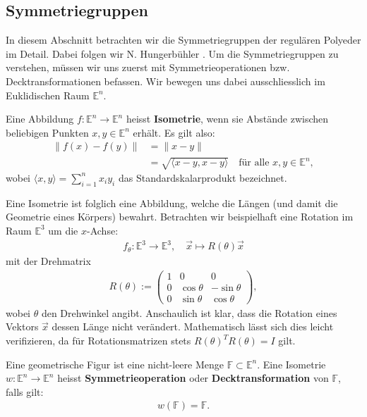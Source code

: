 \subsection{Symmetriegruppen} \label{sec:symmetrieeigenschaftwürfel}

In diesem Abschnitt betrachten wir die Symmetriegruppen der regulären Polyeder im Detail. Dabei folgen wir N. Hungerbühler \cite{hungerbuehler_kombinatorik1}. Um die Symmetriegruppen zu verstehen, müssen wir uns zuerst mit Symmetrieoperationen bzw. Decktransformationen befassen. Wir bewegen uns dabei ausschliesslich im Euklidischen Raum $\mathbb{E}^n$.

\begin{definition}
    Eine Abbildung $f: \mathbb{E}^n \to \mathbb{E}^n$ heisst \textbf{Isometrie}, wenn sie Abstände zwischen beliebigen Punkten $x, y \in \mathbb{E}^n$ erhält. Es gilt also:
    \begin{align}
        \|f(x) - f(y)\| &= \|x - y\| \nonumber \\
        &= \sqrt{\langle x - y, x - y \rangle} \quad \text{für alle } x, y \in \mathbb{E}^n, \nonumber
    \end{align}
    wobei $\langle x, y \rangle = \sum_{i=1}^n x_i y_i$ das Standardskalarprodukt bezeichnet.
\end{definition}

Eine Isometrie ist folglich eine Abbildung, welche die Längen (und damit die Geometrie eines Körpers) bewahrt. Betrachten wir beispielhaft eine Rotation im Raum $\mathbb{E}^3$ um die $x$-Achse:
\begin{align}
     f_\theta: \mathbb{E}^3 \rightarrow \mathbb{E}^3, \quad \vec{x} \mapsto R(\theta) \vec{x} \nonumber
\end{align}
mit der Drehmatrix
\begin{align}
    R(\theta) := \begin{pmatrix} 1 & 0 & 0 \\ 0 & \cos\theta & -\sin\theta \\ 0 & \sin\theta & \cos\theta \end{pmatrix} \nonumber,
\end{align}
wobei $\theta$ den Drehwinkel angibt. Anschaulich ist klar, dass die Rotation eines Vektors $\vec{x}$ dessen Länge nicht verändert. Mathematisch lässt sich dies leicht verifizieren, da für Rotationsmatrizen stets $R(\theta)^T R(\theta) = I$ gilt.

\begin{definition} \label{def:decktransformation}
    Eine geometrische Figur ist eine nicht-leere Menge $\mathbb{F} \subset \mathbb{E}^n$. Eine Isometrie $w: \mathbb{E}^n \to \mathbb{E}^n$ heisst \textbf{Symmetrieoperation} oder \textbf{Decktransformation} von $\mathbb{F}$, falls gilt:
    \begin{align}
        w(\mathbb{F}) = \mathbb{F}. \nonumber
    \end{align}
\end{definition}

